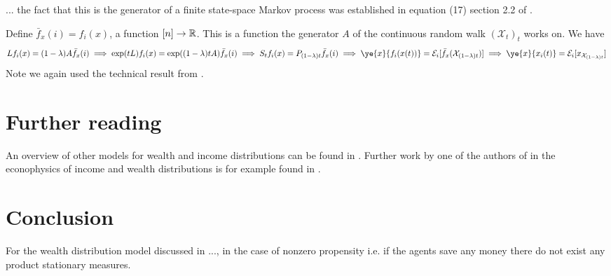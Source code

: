 \documentclass{article}
\begin{document}
... the fact that this is the generator of a finite state-space Markov process was established in equation (17) section 2.2 of \cite{frankredig2014}.

Define $\bar{f}_x(i) = f_i(x)$, a function $[n] \to \mathbb{R}$. This is a function the generator $A$ of the continuous random walk $(\mathcal{X}_t)_t$ works on. We have
\[
Lf_i(x) = (1 - \lambda) A \bar{f}_x(i)
\\\implies
\exp(tL)f_i(x) = \exp((1 - \lambda)t A) \bar{f}_x (i)
\\\implies
S_t f_i(x) = P_{(1 - \lambda)t} \bar{f}_x(i)
\\\implies
\ye{x}{f_i(x(t))} = \mathcal{E}_i\brackets{\bar{f}_x(\mathcal{X}_{(1-\lambda)t})}
\\\implies
\ye{x}{x_i(t)} = \mathcal{E}_i\brackets{x_{\mathcal{X}_{(1-\lambda)t}}}
\]
Note we again used the technical result from \cite{voss2011equivalence}.


\section*{Further reading}
An overview of other models for wealth and income distributions can be found in \cite{chakrabarti2013econophysics}. Further work by one of the authors of \cite{cirillo2014duality} in the econophysics of income and wealth distributions is for example found in \cite{redig2015multilinearity, 2008arXiv0802.1416D, redig2017generalized}.



\section*{Conclusion}
For the wealth distribution model discussed in ..., in the case of nonzero propensity i.e. if the agents save any money there do not exist any product stationary measures.



\printbibliography
\end{document}
